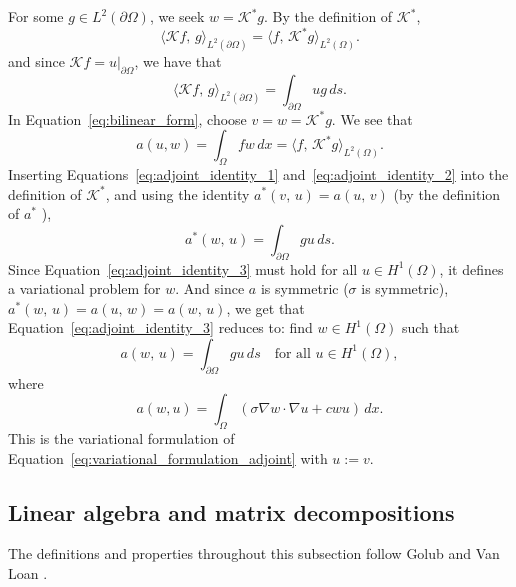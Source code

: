 For some $g \in L^2(\partial\Omega)$, we seek $w = \mathcal{K}^* g$. By the definition of $\mathcal{K}^*$,
\begin{equation*}
    \langle \mathcal{K} f,\, g \rangle_{L^2(\partial\Omega)} =
    \langle f,\, \mathcal{K}^* g \rangle_{L^2(\Omega)}.
\end{equation*}
and since $\mathcal{K} f = u|_{\partial\Omega}$, we have that
\begin{equation}\label{eq:adjoint_identity_1}
    \langle \mathcal{K} f,\, g \rangle_{L^2(\partial\Omega)} =
    \int_{\partial\Omega} u g \, ds.
\end{equation}
In Equation~\eqref{eq:bilinear_form}, choose $v = w = \mathcal{K}^* g$. We see that
\begin{equation}\label{eq:adjoint_identity_2}
    a(u, w) = \int_{\Omega} f w \, dx = \langle f,\, \mathcal{K}^* g \rangle_{L^2(\Omega)}.
\end{equation}
Inserting Equations~\eqref{eq:adjoint_identity_1} and~\eqref{eq:adjoint_identity_2} into the definition of $\mathcal{K}^*$, and using the identity $a^*(v,\, u) = a(u,\, v)$ (by the definition of $a^*$ \cite{kreyszigIntroductoryFunctionalAnalysis1989}),
\begin{equation}\label{eq:adjoint_identity_3}
    a^*(w,\, u) = \int_{\partial\Omega} g u \, ds.
\end{equation}
Since Equation~\eqref{eq:adjoint_identity_3} must hold for all $u \in H^1(\Omega)$, it defines a variational problem for $w$. And since $a$ is symmetric ($\sigma$ is symmetric),
$a^*(w,\, u) = a(u,\, w) = a(w,\, u)$, we get that Equation~\eqref{eq:adjoint_identity_3} reduces to:
find $w \in H^1(\Omega)$ such that
\begin{equation*}
    a(w,\, u) = \int_{\partial\Omega} g u \, ds
    \quad \text{for all } u \in H^1(\Omega),
\end{equation*}
where
\begin{equation*}
    a(w, u) = \int_{\Omega}
    (\sigma \nabla w \cdot \nabla u + c w u)\, dx.
\end{equation*}
This is the variational formulation of Equation~\eqref{eq:variational_formulation_adjoint} with $u := v$.


\subsection{Linear algebra and matrix decompositions}\label{appendix:linear_algebra}
The definitions and properties throughout this subsection follow Golub and Van Loan \cite{golubMatrixComputations4th2013}.

